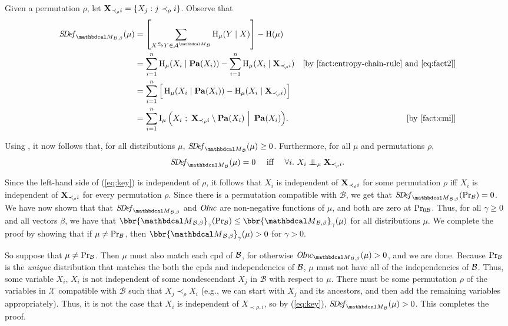 \begin{subappendices}
\begin{lproof}
Given a permutation $\rho$, let ${\bf X}_{\prec_\rho i} = \{X_j: j
\prec_\rho i\}$.  Observe that 
\begin{align*}
    \SDef_{\PDGof{\mathcal B,\beta}}(\mu)
 	&= \left[\sum_{\ed aXY \in \Ar^{\PDGof{\mathcal B}}} \H_\mu(Y\mid X) \right] - \H(\mu) \\
	&= \sum_{i=1}^n \H_\mu(X_i \mid \Pa(X_i)) - \sum_{i = 1}^n
\H_\mu(X_i \mid {\bf X}_{\prec_\rho i}) & \text{[by
    \Cref{fact:entropy-chain-rule} and \eqref{eq:fact2}]}\\ 
	&= \sum_{i=1}^n \Big[\H_\mu(X_i \mid \Pa(X_i)) - \H_\mu(X_i
  \mid {\bf X}_{\prec_\rho i} )\Big] \\ 
      &= \sum_{i=1}^n \I_\mu \Big( X_i ~;~ {\bf X}_{\prec_\rho i}
    \setminus \Pa(X_i) ~\Big|~ \Pa(X_i) \Big). & \text{[by
        \Cref{fact:cmi}]} 
\end{align*}

Using , it now follows that,
for all distributions $\mu$,
$\SDef_{\PDGof{\mathcal B}}(\mu) \ge 0$.
Furthermore, for all $\mu$ and permutations $\rho$,
\begin{equation}\label{eq:key}
  \SDef_{\PDGof{\mathcal B}}(\mu) = 0 \quad\mbox{ iff }\quad 
    \forall i.~X_i \CI_\mu {\bf X}_{\prec_\rho i}.
\end{equation}

Since the left-hand side of (\ref{eq:key}) is independent of $\rho$,
it follows that $X_i$ is independent of 
${\bf X}_{\prec_\rho i}$ for some permutation $\rho$ iff $X_i$ is independent of
  ${\bf X}_{\prec_\rho i}$ for every permutation $\rho$.  Since there
is a permutation compatible with $\mathcal B$, we get that 
$\SDef_{\PDGof{\mathcal B,\beta}}(\Pr_{\cal B}) = 0$.
We have now shown that that $\SDef_{\PDGof{\mathcal B, \beta}}$ and $\mathit{O\mskip-2.5muI\mskip-3.5mun\mskip-1.7muc}$ are 
non-negative functions of $\mu$, and both are zero at $\Pr_{0\cal B}$. 
Thus, for all $\gamma \geq 0$ and all vectors $\beta$, we
have that   $\bbr{\PDGof{\mathcal B, \beta}}_\gamma( \Pr_{\cal
  B}) \le \bbr{\PDGof{\mathcal B, \beta}}_\gamma( \mu)$ for all
distributions $\mu$.  We complete the proof by showing that if
$\mu \ne \Pr_{\cal B}$, then 
$\bbr{\PDGof{\mathcal B, \beta}}_\gamma(\mu) > 0$
for $\gamma > 0$.

So suppose that $\mu \ne \Pr_{\cal B}$. 
Then $\mu$ must also match each cpd of $\cal B$,
for otherwise $\OInc_{\PDGof{\mathcal B,
\beta}}(\mu) > 0$, and we are done.  
Because $\Pr_{\cal B}$ is the \emph{unique} distribution that matches the 
both the cpds and independencies of $\cal B$, $\mu$ must not have all of the 
independencies of $\cal B$. 
Thus,
some variable $X_i$, $X_i$ is not independent of some nondescendant $X_j$ in
$\mathcal B$ with respect to $\mu$.  There must be some permutation
$\rho$ of the variables in $\mathcal X$ compatible with ${\mathcal B}$
such that $X_j \prec_{\rho} X_i$ (e.g., we can start with $X_j$ and
its ancestors, and then add the remaining variables appropriately).
Thus, it is not the case that $X_i$ is independent of $X_{\prec \rho,
  i}$, so by (\ref{eq:key}), $\SDef_{\PDGof{\mathcal B}}(\mu) > 0$.
This completes the proof.
\end{lproof}


\end{subappendices}
